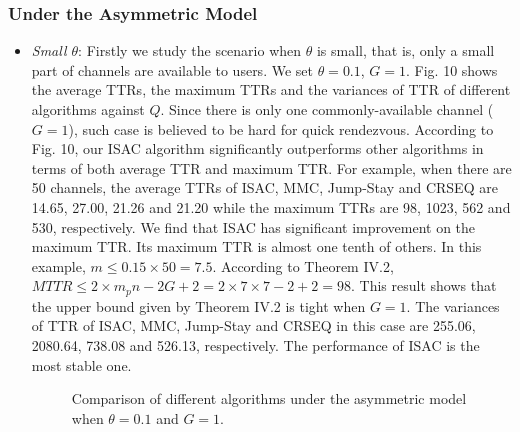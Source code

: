 \documentclass[journal]{IEEEtran}
\begin{document}
\subsubsection{Under the Asymmetric Model}
\begin{itemize}
\item \emph{Small $\theta$}: Firstly we study the scenario when $\theta$ is small, that is, only a small part of channels are available to users. We set $\theta=0.1$, $G=1$. Fig. 10 shows the average TTRs, the maximum TTRs and the variances of TTR of different algorithms against $Q$. Since there is only one commonly-available channel ($G=1$), such case is believed to be hard for quick rendezvous. According to Fig. 10, our ISAC algorithm significantly outperforms other algorithms in terms of both average TTR and maximum TTR. For example, when there are 50 channels, the average TTRs of ISAC, MMC, Jump-Stay and CRSEQ are 14.65, 27.00, 21.26 and 21.20 while the maximum TTRs are 98, 1023, 562 and 530, respectively. We find that ISAC has significant improvement on the maximum TTR. Its maximum TTR is almost one tenth of others. In this example, $m\leq0.15\times50=7.5$. According to Theorem IV.2, $MTTR\leq 2\times m_pn-2G+2=2\times 7\times7-2+2=98$. This result shows that the upper bound given by Theorem IV.2 is tight when $G=1$. The variances of TTR of ISAC, MMC, Jump-Stay and CRSEQ in this case are 255.06, 2080.64, 738.08 and 526.13, respectively. The performance of ISAC is the most stable one.
\begin{figure}
\centering
{}
\hspace{1in}
\hspace{1in}
\hspace{1in}
\caption{Comparison of different algorithms under the asymmetric model when $\theta=0.1$ and $G=1$.}
\end{figure}

\end{itemize}
\end{document}
